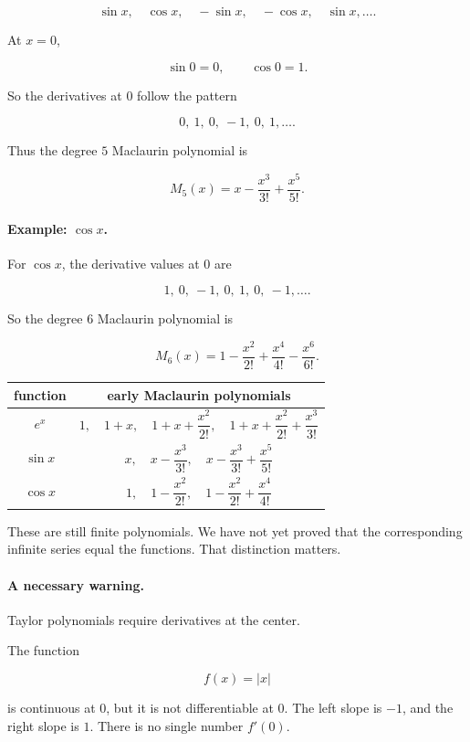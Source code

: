 \[
\sin x,\quad \cos x,\quad -\sin x,\quad -\cos x,\quad \sin x,\ldots.
\]

At \(x=0\),

\[
\sin0=0,
\qquad
\cos0=1.
\]

So the derivatives at \(0\) follow the pattern

\[
0,\ 1,\ 0,\ -1,\ 0,\ 1,\ldots.
\]

Thus the degree \(5\) Maclaurin polynomial is

\[
\boxed{
M_5(x)=x-\frac{x^3}{3!}+\frac{x^5}{5!}.
}
\]

\paragraph{Example: \(\cos x\).}
For \(\cos x\), the derivative values at \(0\) are

\[
1,\ 0,\ -1,\ 0,\ 1,\ 0,\ -1,\ldots.
\]

So the degree \(6\) Maclaurin polynomial is

\[
\boxed{
M_6(x)=1-\frac{x^2}{2!}+\frac{x^4}{4!}-\frac{x^6}{6!}.
}
\]

\begin{center}
\begin{tabular}{c|c}
\textbf{function} & \textbf{early Maclaurin polynomials} \\ \hline
\(e^x\) &
\(1,\quad 1+x,\quad 1+x+\dfrac{x^2}{2!},\quad
1+x+\dfrac{x^2}{2!}+\dfrac{x^3}{3!}\) \\[8pt]
\(\sin x\) &
\(x,\quad x-\dfrac{x^3}{3!},\quad x-\dfrac{x^3}{3!}+\dfrac{x^5}{5!}\) \\[8pt]
\(\cos x\) &
\(1,\quad 1-\dfrac{x^2}{2!},\quad
1-\dfrac{x^2}{2!}+\dfrac{x^4}{4!}\)
\end{tabular}
\end{center}

These are still finite polynomials.  We have not yet proved that the corresponding
infinite series equal the functions.  That distinction matters.

\paragraph{A necessary warning.}
Taylor polynomials require derivatives at the center.

The function

\[
f(x)=|x|
\]

is continuous at \(0\), but it is not differentiable at \(0\).  The left slope is \(-1\), and
the right slope is \(1\).  There is no single number \(f'(0)\).

